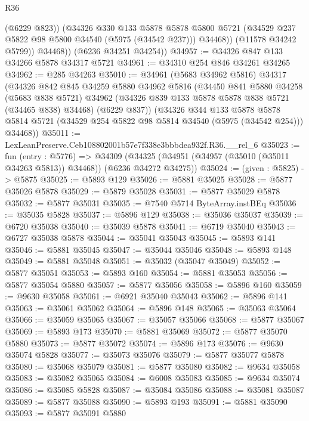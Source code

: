 \begin{lexlean}{R36}
\begin{coremodule}
                (@6229 @823))
              (@34326
                @330
                @133
                @5878
                @5878
                @5800
                @5721
                (@34529 @237 @5822 @98 @5800 @34540 (@5975 (@34542 @237)))
                @34468))
            (@11578 @34242 @5799))
          @34468))
      (@6236 @34251 @34254))
@34957 := @34326 @847 @133 @34266 @5878 @34317 @5721
@34961 := @34310 @254 @846 @34261 @34265
@34962 := @285 @34263
@35010 := @34961
    (@5683 @34962 @5816)
    @34317
    (@34326
      @842
      @845
      @34259
      @5880
      @34962
      @5816
      (@34450
        @841
        @5880
        @34258
        (@5683 @838 @5721)
        @34962
        (@34326 @839 @133 @5878 @5878 @838 @5721 (@34465 @838) @34468)
        (@6229 @837))
      (@34326
        @344
        @133
        @5878
        @5878
        @5814
        @5721
        (@34529 @254 @5822 @98 @5814 @34540 (@5975 (@34542 @254)))
        @34468))
@35011 := LexLeanPreserve.Ceb108802001b57e7f338e3bbbdea932f.R36.__rel_6
@35023 := fun (entry : @5776) =>
  @34309 (@34325 (@34951 (@34957 (@35010 (@35011 @34263 @5813)) @34468)) (@6236 @34272 @34275))
@35024 := (given : @5825) -> @5875
@35025 := @5893 @129
@35026 := @5881 @35025
@35028 := @5877 @35026 @5878
@35029 := @5879 @35028
@35031 := @5877 @35029 @5878
@35032 := @5877 @35031
@35035 := @7540 @5714 ByteArray.instBEq
@35036 := @35035 @5828
@35037 := @5896 @129
@35038 := @35036 @35037
@35039 := @6720 @35038
@35040 := @35039 @5878
@35041 := @6719 @35040
@35043 := @6727 @35038 @5878
@35044 := @35041 @35043
@35045 := @5893 @141
@35046 := @5881 @35045
@35047 := @35044 @35046
@35048 := @5893 @148
@35049 := @5881 @35048
@35051 := @35032 (@35047 @35049)
@35052 := @5877 @35051
@35053 := @5893 @160
@35054 := @5881 @35053
@35056 := @5877 @35054 @5880
@35057 := @5877 @35056
@35058 := @5896 @160
@35059 := @9630 @35058
@35061 := @6921 @35040 @35043
@35062 := @5896 @141
@35063 := @35061 @35062
@35064 := @5896 @148
@35065 := @35063 @35064
@35066 := @35059 @35065
@35067 := @35057 @35066
@35068 := @5877 @35067
@35069 := @5893 @173
@35070 := @5881 @35069
@35072 := @5877 @35070 @5880
@35073 := @5877 @35072
@35074 := @5896 @173
@35076 := @9630 @35074 @5828
@35077 := @35073 @35076
@35079 := @5877 @35077 @5878
@35080 := @35068 @35079
@35081 := @5877 @35080
@35082 := @9634 @35058
@35083 := @35082 @35065
@35084 := @6008 @35083
@35085 := @9634 @35074
@35086 := @35085 @5828
@35087 := @35084 @35086
@35088 := @35081 @35087
@35089 := @5877 @35088
@35090 := @5893 @193
@35091 := @5881 @35090
@35093 := @5877 @35091 @5880

\end{coremodule}
\end{lexlean}
